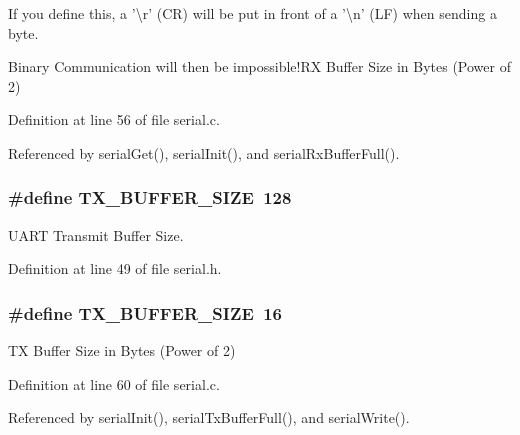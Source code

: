 If you define this, a '\textbackslash{}r' (C\-R) will be put in front of a '\textbackslash{}n' (L\-F) when sending a byte. 

Binary Communication will then be impossible!\-R\-X Buffer Size in Bytes (Power of 2) 

Definition at line 56 of file serial.\-c.



Referenced by serial\-Get(), serial\-Init(), and serial\-Rx\-Buffer\-Full().

\hypertarget{group__uart_ga9ab33647617098646990fe263600b650}{
\subsubsection[{T\-X\-\_\-\-B\-U\-F\-F\-E\-R\-\_\-\-S\-I\-Z\-E}]{\setlength{\rightskip}{0pt plus 5cm}\#define T\-X\-\_\-\-B\-U\-F\-F\-E\-R\-\_\-\-S\-I\-Z\-E~128}}\label{group__uart_ga9ab33647617098646990fe263600b650}


U\-A\-R\-T Transmit Buffer Size. 



Definition at line 49 of file serial.\-h.

\hypertarget{group__uart_ga9ab33647617098646990fe263600b650}{
\subsubsection[{T\-X\-\_\-\-B\-U\-F\-F\-E\-R\-\_\-\-S\-I\-Z\-E}]{\setlength{\rightskip}{0pt plus 5cm}\#define T\-X\-\_\-\-B\-U\-F\-F\-E\-R\-\_\-\-S\-I\-Z\-E~16}}\label{group__uart_ga9ab33647617098646990fe263600b650}


T\-X Buffer Size in Bytes (Power of 2) 



Definition at line 60 of file serial.\-c.



Referenced by serial\-Init(), serial\-Tx\-Buffer\-Full(), and serial\-Write().

